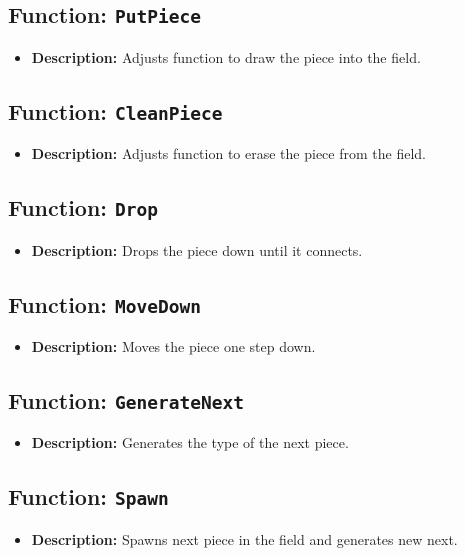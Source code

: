 \documentclass{article}
\begin{document}
\subsection{Function: \texttt{PutPiece}}
\begin{itemize}
    \item \textbf{Description:} Adjusts function to draw the piece into the field.
\end{itemize}

\subsection{Function: \texttt{CleanPiece}}
\begin{itemize}
    \item \textbf{Description:} Adjusts function to erase the piece from the field.
\end{itemize}

\subsection{Function: \texttt{Drop}}
\begin{itemize}
    \item \textbf{Description:} Drops the piece down until it connects.
\end{itemize}

\subsection{Function: \texttt{MoveDown}}
\begin{itemize}
    \item \textbf{Description:} Moves the piece one step down.
\end{itemize}

\subsection{Function: \texttt{GenerateNext}}
\begin{itemize}
    \item \textbf{Description:} Generates the type of the next piece.
\end{itemize}

\subsection{Function: \texttt{Spawn}}
\begin{itemize}
    \item \textbf{Description:} Spawns next piece in the field and generates new next.
\end{itemize}
\end{document}
